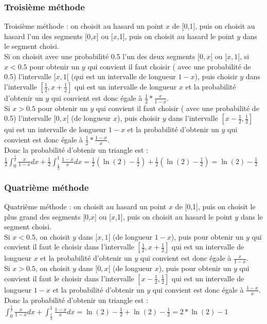 \documentclass[a4paper,11pt]{book}
\begin{document}
\subsubsection{Troisi\`eme m\'ethode}
Troisi\`eme m\'ethode : on choisit au hasard un point $x$ de [0,1], puis 
on choisit au hasard l'un des segments [0,$x$] ou [$x$,1], puis on choisit 
au hasard le point $y$ dans le segment choisi.\\
Si on choisit avec une probabilit\'e 0.5 l'un des deux segments $[0,x[$ ou
$[x,1[$, si $x<0.5$ pour obtenir un $y$ qui convient il faut choisir  (
avec une probabilit\'e de 0.5) 
l'intervalle  $[x,1[$ (qui est un intervalle de longueur $1-x$), puis choisir $y$ dans l'intervalle 
$[\frac{1}{2},x+\frac{1}{2}]$ qui est un intervalle de longueur $x$ et la probabilit\'e 
d'obtenir un $y$ qui convient est donc \'egale \`a $\displaystyle \frac{1}{2}*\frac{x}{1-x}$.\\
Si $x>0.5$ pour obtenir un $y$ qui convient il faut choisir  (
avec une probabilit\'e de 0.5) l'intervalle
 $[0,x[$ (de longueur $x$), puis choisir $y$ dans l'intervalle 
$\displaystyle [x-\frac{1}{2},\frac{1}{2}]$ qui est un intervalle de longueur $1-x$ et la probabilit\'e 
d'obtenir un $y$ qui convient est donc \'egale \`a $\frac{1}{2}*\frac{1-x}{x}$.\\
Donc la probabilit\'e d'obtenir un triangle est :\\
$\displaystyle \frac{1}{2}\int_0^{\frac{1}{2}}\frac{x}{1-x}dx+\frac{1}{2}\int_{\frac{1}{2}}^1\frac{1-x}{x}dx=\frac{1}{2}(\ln(2)-\frac{1}{2})+\frac{1}{2}(\ln(2)-\frac{1}{2})=\ln(2)-\frac{1}{2}$
\subsubsection{Quatri\`eme m\'ethode}
Quatri\`eme m\'ethode : on choisit au hasard un point $x$ de [0,1], puis 
on choisit le plus grand des segments [0,$x$] ou [$x$,1], puis on choisit 
au hasard le point $y$ dans le segment choisi.\\
 Si $x<0.5$, on  choisit  $y$ dans 
 $[x,1[$ (de longueur $1-x$), puis pour obtenir un $y$ qui convient il faut 
le choisir dans l'intervalle 
$[\frac{1}{2},x+\frac{1}{2}]$ qui est un intervalle de longueur $x$ et la probabilit\'e 
d'obtenir un $y$ qui convient est donc \'egale \`a $\displaystyle \frac{x}{1-x}$.\\
Si $x>0.5$,  on  choisit  $y$ dans  $[0,x[$ (de longueur $x$), puis pour obtenir un $y$ qui convient il faut le choisir dans l'intervalle 
$[x-\frac{1}{2},\frac{1}{2}]$ qui est un intervalle de longueur $1-x$ et la probabilit\'e 
d'obtenir un $y$ qui convient est donc \'egale \`a $\displaystyle \frac{1-x}{x}$.\\
Donc la probabilit\'e d'obtenir un triangle est :\\
$\displaystyle \int_0^{\frac{1}{2}}\frac{x}{1-x}dx+\int_{\frac{1}{2}}^1\frac{1-x}{x}dx=\ln(2)-\frac{1}{2}+\ln(2)-\frac{1}{2}=2*\ln(2)-1$
\end{document}
